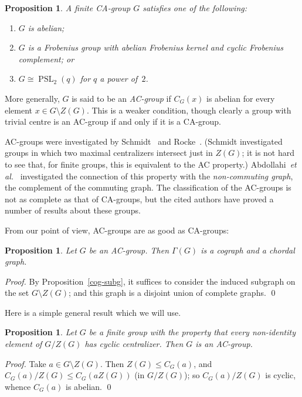 \documentclass{elsarticle}
\newtheorem{prop}[theorem]{Proposition}
\newcommand{\PSL}{\mathop{\mathrm{PSL}}\nolimits}
\begin{document}
\begin{prop}
A finite CA-group $G$ satisfies one of the following:
\begin{enumerate}
\item $G$ is abelian;
\item $G$ is a Frobenius group with abelian Frobenius kernel and cyclic
Frobenius complement; or
\item $G\cong\PSL_2(q)$ for $q$ a power of~$2$.
\end{enumerate}
\label{ca-thm}
\end{prop}

More generally, $G$ is said to be an \emph{AC-group} if $C_G(x)$ is abelian
for every element $x\in G\setminus Z(G)$. This is a weaker condition, though
clearly a group with trivial centre is an AC-group if and only if it is a
CA-group.

AC-groups were investigated by Schmidt~\cite{Sch70} and Rocke~\cite{Ro75}.
(Schmidt investigated groups in which two maximal centralizers intersect just
in $Z(G)$; it is not hard to see that, for finite groups, this is equivalent to
the AC property.) Abdollahi~\emph{et al.}~\cite{AA06} investigated the
connection of this property with the \emph{non-commuting graph}, the
complement of the commuting graph. The classification of the AC-groups is not
as complete as that of CA-groups, but the cited authors have proved a
number of results about these groups.

From our point of view, AC-groups are as good as CA-groups:

\begin{prop}\label{cent-abe}
Let $G$ be an AC-group. Then $\Gamma(G)$ is a cograph and a chordal graph.
\end{prop}

\begin{proof}
By Proposition~\ref{cog-subg}, it suffices to consider the induced subgraph on
the set $G\setminus Z(G)$; and this graph is a disjoint union of complete
graphs. \qed
\label{ac-prop}
\end{proof}

Here is a simple general result which we will use.

\begin{prop}
Let $G$ be a finite group with the property that every non-identity element
of $G/Z(G)$ has cyclic centralizer. Then $G$ is an AC-group.
\label{p-ac-cyc}
\end{prop}

\begin{proof}
Take $a\in G\setminus Z(G)$. Then $Z(G)\le C_G(a)$, and $C_G(a)/Z(G)\le C_G(aZ(G))$ (in
$G/Z(G)$); so $C_G(a)/Z(G)$ is cyclic, whence $C_G(a)$ is abelian. \qed
\end{proof}
\end{document}
